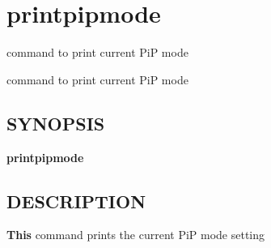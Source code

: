 \hypertarget{group__printpipmode}{\section{printpipmode}
\label{group__printpipmode}
}


command to print current Pi\-P mode  


command to print current Pi\-P mode \hypertarget{group__piplnlibs_synopsis}{}\subsection{S\-Y\-N\-O\-P\-S\-I\-S}\label{group__piplnlibs_synopsis}
{\bfseries printpipmode} \hypertarget{group__piplnlibs_description}{}\subsection{D\-E\-S\-C\-R\-I\-P\-T\-I\-O\-N}\label{group__piplnlibs_description}
{\bfseries This} command prints the current Pi\-P mode setting 